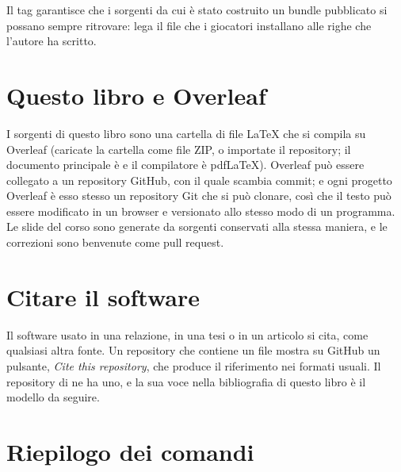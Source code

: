 Il tag garantisce che i sorgenti da cui è stato costruito un bundle pubblicato
si possano sempre ritrovare: lega il file che i giocatori installano alle
righe che l'autore ha scritto.

\section{Questo libro e Overleaf}

I sorgenti di questo libro sono una cartella di file \LaTeX{} che si compila
su Overleaf (caricate la cartella come file ZIP, o importate il repository; il
documento principale è  e il compilatore è pdf\LaTeX).
Overleaf può essere collegato a un repository GitHub, con il quale scambia
commit; e ogni progetto Overleaf è esso stesso un repository Git che si può
clonare, così che il testo può essere modificato in un browser e versionato
allo stesso modo di un programma. Le slide del corso sono generate da sorgenti
conservati alla stessa maniera, e le correzioni sono benvenute come pull
request.

\section{Citare il software}

Il software usato in una relazione, in una tesi o in un articolo si cita, come
qualsiasi altra fonte. Un repository che contiene un file
 mostra su GitHub un pulsante, \emph{Cite this
repository}, che produce il riferimento nei formati usuali. Il repository di
\prg ne ha uno, e la sua voce nella bibliografia di questo libro
\citep{prg32repo} è il modello da seguire.

\section{Riepilogo dei comandi}

